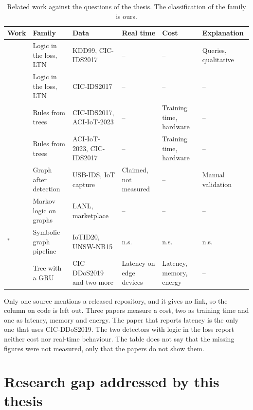 \begin{table}[htbp]
\centering
\footnotesize
\setlength{\tabcolsep}{3pt}
\caption{Related work against the questions of the thesis. The classification
of the family is ours.}
\label{tab:synthesis}
\begin{tabular}{@{}p{2.2cm}p{2.2cm}p{2.3cm}p{1.5cm}p{1.5cm}p{1.9cm}@{}}
\toprule
Work & Family & Data & Real time & Cost & Explanation \\
\midrule
\citet{onchis2022neurosymbolic}
  & Logic in the loss, LTN & KDD99, CIC-IDS2017 & --  & -- & Queries, qualitative \\
\citet{bizzarri2024nsaids}
  & Logic in the loss, LTN & CIC-IDS2017 & -- & -- & -- \\
\citet{tran2025odxu}
  & Rules from trees & CIC-IDS2017, ACI-IoT-2023 & -- & Training time, hardware & -- \\
\citet{tran2025transfer}
  & Rules from trees & ACI-IoT-2023, CIC-IDS2017 & -- & Training time, hardware & -- \\
\citet{kalutharage2025neurosymbolic}
  & Graph after detection & USB-IDS, IoT capture & Claimed, not measured & -- & Manual validation \\
\citet{zhou2024knowgraph}
  & Markov logic on graphs & LANL, marketplace & -- & -- & -- \\
\citet{aresrobledo2025hyperparameter}$^{*}$
  & Symbolic graph pipeline & IoTID20, UNSW-NB15 & n.s. & n.s. & n.s. \\
\citet{alemayehu2026deployment}
  & Tree with a GRU & CIC-DDoS2019 and two more & Latency on edge devices & Latency, memory, energy & -- \\
\bottomrule
\end{tabular}
\end{table}

Only one source mentions a released repository, and it gives no link, so the
column on code is left out. Three papers measure a cost, two as training time
and one as latency, memory and energy. The paper that reports latency is the
only one that uses CIC-DDoS2019. The two detectors with logic in the loss report neither cost nor
real-time behaviour. The table does not say that the missing figures were not
measured, only that the papers do not show them.

\section{Research gap addressed by this thesis}
\label{sec:research-gap}

